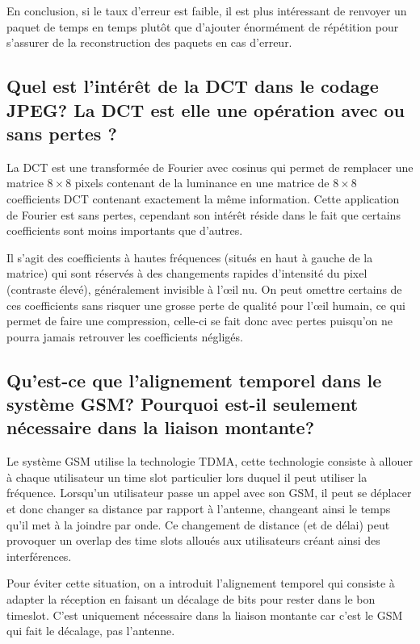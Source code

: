 En conclusion, si le taux d'erreur est faible, il est plus intéressant de renvoyer un paquet de temps en temps plutôt que d'ajouter énormément de répétition pour s'assurer de la reconstruction des paquets en cas d'erreur.

\subsection{Quel est l'intérêt de la DCT dans le codage JPEG? La DCT est elle une opération avec ou sans pertes ?}

La DCT est une transformée de Fourier avec cosinus qui permet de remplacer une matrice $8\times 8$ pixels contenant de la luminance en une matrice de $8\times 8$ coefficients DCT contenant exactement la même information. Cette application de Fourier est sans pertes, cependant son intérêt réside dans le fait que certains coefficients sont moins importants que d'autres.

Il s'agit des coefficients à hautes fréquences (situés en haut à gauche de la matrice) qui sont réservés à des changements rapides d'intensité du pixel (contraste élevé), généralement invisible à l'\oe il nu. On peut omettre certains de ces coefficients sans risquer une grosse perte de qualité pour l'\oe il humain, ce qui permet de faire une compression, celle-ci se fait donc avec pertes puisqu'on ne pourra jamais retrouver les coefficients négligés.

\subsection{Qu'est-ce que l'alignement temporel dans le système GSM? Pourquoi est-il seulement nécessaire dans la liaison montante?}

Le système GSM utilise la technologie TDMA, cette technologie consiste à allouer à chaque utilisateur un time slot particulier lors duquel il peut utiliser la fréquence. Lorsqu'un utilisateur passe un appel avec son GSM, il peut se déplacer et donc changer sa distance par rapport à l'antenne, changeant ainsi le temps qu'il met à la joindre par onde. Ce changement de distance (et de délai) peut provoquer un overlap des time slots alloués aux utilisateurs créant ainsi des interférences.

Pour éviter cette situation, on a introduit l'alignement temporel qui consiste à adapter la réception en faisant un décalage de bits pour rester dans le bon timeslot. C'est uniquement nécessaire dans la liaison montante car c'est le GSM qui fait le décalage, pas l'antenne.

